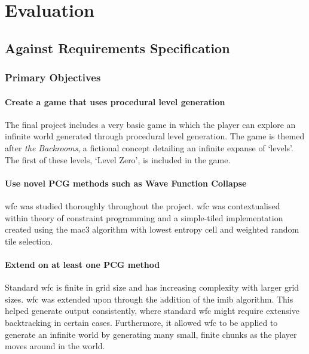 \chapter{Evaluation}

\section{Against Requirements Specification}
\subsection{Primary Objectives}
\subsubsection{Create a game that uses procedural level generation}
The final project includes a very basic game in which the player can explore an infinite world generated through procedural level generation. The game is themed after \textit{the Backrooms}, a fictional concept detailing an infinite expanse of `levels'. The first of these levels, `Level Zero', is included in the game.

\subsubsection{Use novel PCG methods such as Wave Function Collapse}
\acrlong{wfc} was studied thoroughly throughout the project. \acrshort{wfc} was contextualised within theory of constraint programming and a simple-tiled implementation created using the \acrshort{mac3} algorithm with lowest entropy cell and weighted random tile selection.

\subsubsection{Extend on at least one PCG method}
Standard \acrlong{wfc} is finite in grid size and has increasing complexity with larger grid sizes. \acrshort{wfc} was extended upon through the addition of the \acrlong{imib} algorithm. This helped generate output consistently, where standard \acrshort{wfc} might require extensive backtracking in certain cases. Furthermore, it allowed \acrshort{wfc} to be applied to generate an infinite world by generating many small, finite chunks as the player moves around in the world.

